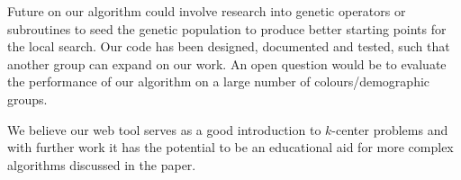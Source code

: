 Future on our algorithm could involve research into genetic operators or subroutines to seed the genetic population to produce better starting points for the local search. Our code has been designed, documented and tested, such that another group can expand on our work. An open question would be to evaluate the performance of our algorithm on a large number of colours/demographic groups. 

We believe our web tool serves as a good introduction to $k$-center problems and with further work it has the potential to be an educational aid for more complex algorithms discussed in the paper.